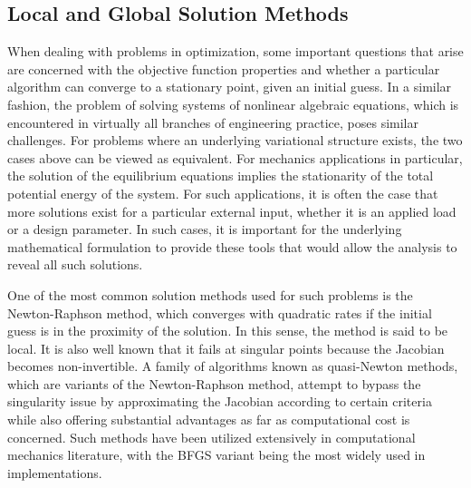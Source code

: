 \subsection{Local and Global Solution Methods}

When dealing with problems in optimization, some important questions that arise 
are concerned with the objective function properties and whether a particular 
algorithm can converge to a stationary point, given an initial guess. In a 
similar fashion, the problem of solving systems of nonlinear algebraic 
equations, which is encountered in virtually all branches of engineering 
practice, poses similar challenges. For problems where an underlying 
variational structure exists, the two cases above can be viewed as equivalent. 
For mechanics applications in particular, the solution of the equilibrium 
equations implies the stationarity of the total potential energy of the system. 
For such applications, it is often the case that more solutions exist for a 
particular external input, whether it is an applied load or a design parameter. 
In such cases, it is important for the underlying mathematical formulation to 
provide these tools that would allow the analysis to reveal all such solutions.

One of the
most common solution methods used for such problems is the Newton-Raphson 
method\cite{Ypma:1995}, which
converges with quadratic rates if the initial guess is in the proximity of the
solution. In this sense, the method is said to be local. It is also well known 
that it fails at singular points because the Jacobian becomes 
non-invertible\cite{Dennis:1996}. A family of 
algorithms known as quasi-Newton
methods\cite{Broyden:1965,Davidon:1991,Berndt:1974}, which are variants of the 
Newton-Raphson method, attempt to bypass the singularity issue by approximating 
the Jacobian according to certain criteria while also offering substantial
advantages as far as computational cost is concerned. Such methods have been 
utilized extensively in
computational mechanics literature\cite{Matthies:1979,Hughes:1983}, with the 
BFGS\cite{Liu:1989} variant being the most widely used in implementations.

